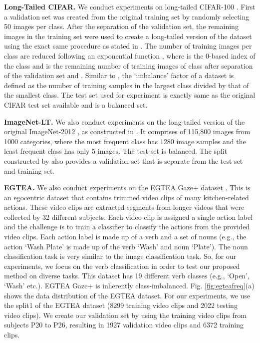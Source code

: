\documentclass[runningheads]{llncs}
\begin{document}
\textbf{Long-Tailed CIFAR.} We conduct experiments on long-tailed 
CIFAR-100 \cite{CIFAR}. First a validation set was created from the original training set 
by randomly selecting 50 images per class. After the separation of the 
validation set, the remaining images in the training set were used to create a 
long-tailed version of the dataset using the exact same procedure as stated in 
\cite{Class_balancedloss}. The number of training images per class are reduced following an 
exponential function , where  is the 0-based index of the class 
and  is the remaining number of training images of class  after 
separation of the validation set and .  Similar to \cite{Class_balancedloss}, the 
‘imbalance’ factor of a dataset is defined as the number of training samples in 
the largest class divided by that of the smallest class. The test set used for 
experiment is exactly same as the original CIFAR test set available and is a 
balanced set.

\textbf{ImageNet-LT.} We also conduct experiments on the long-tailed version of the original ImageNet-2012 \cite{Imagenet}, as constructed in \cite{OLTR}. It comprises of 115,800 images from 1000 categories, where the most frequent class has 1280 image samples and the least frequent class has only 5 images. The test set is balanced. The split constructed by \cite{OLTR} also provides a validation set that is separate from the test set and training set.

\textbf{EGTEA.} We also conduct experiments on the EGTEA Gaze+ dataset 
\cite{EGTEA}. This is an egocentric dataset that contains trimmed video clips of many 
kitchen-related actions. These video clips are extracted segments from longer 
videos that were collected by 32 different subjects. Each video clip is 
assigned 
a single action label and the challenge is to train a classifier to classify the 
actions from the provided video clips. Each action label is made up of a verb 
and a set of nouns (e.g., the action ‘Wash Plate’ is made up of the verb ‘Wash’ 
and noun ‘Plate’). The noun classification task is very similar to the image 
classification task. So, for our experiments, we focus on the
verb classification in order to test our proposed method on diverse tasks. This 
dataset has 19 different verb classes (e.g., ‘Open’, ‘Wash’ etc.). EGTEA Gaze+ 
\cite{EGTEA} is inherently class-imbalanced. Fig. \ref{fig:egteafreq}(a) shows 
the data distribution of the 
EGTEA dataset. For our experiments, we use the split1 of the EGTEA dataset (8299 
training video clips and 2022 testing video clips). We create our validation set 
by using the training video clips from subjects P20 to P26, resulting in 1927 
validation video clips and 6372 training clips.
 
\end{document}

